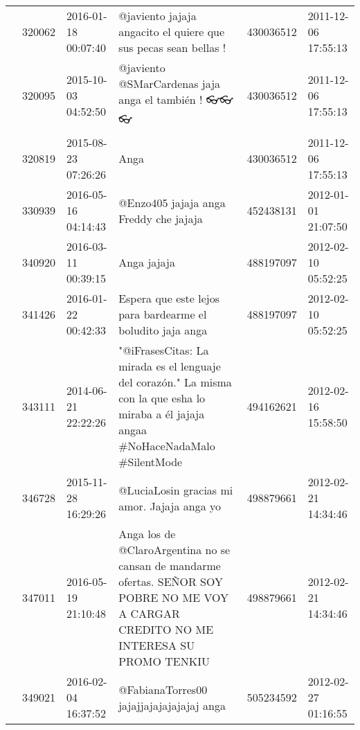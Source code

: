 \begin{tabular}{llllrl}
           & 320062  & 2016-01-18 00:07:40 &                                                                              @javiento jajaja angacito el quiere que sus pecas sean bellas ! &   430036512 & 2011-12-06 17:55:13 \\
           & 320095  & 2015-10-03 04:52:50 &                                                                                           @javiento @SMarCardenas jaja anga el también ! 👓👓👓 &   430036512 & 2011-12-06 17:55:13 \\
           & 320819  & 2015-08-23 07:26:26 &                                                                                                                                         Anga &   430036512 & 2011-12-06 17:55:13 \\
           & 330939  & 2016-05-16 04:14:43 &                                                                                                       @Enzo405 jajaja anga Freddy che jajaja &   452438131 & 2012-01-01 21:07:50 \\
           & 340920  & 2016-03-11 00:39:15 &                                                                                                                                  Anga jajaja &   488197097 & 2012-02-10 05:52:25 \\
           & 341426  & 2016-01-22 00:42:33 &                                                                                   Espera que este lejos para bardearme el boludito jaja anga &   488197097 & 2012-02-10 05:52:25 \\
           & 343111  & 2014-06-21 22:22:26 &      "@iFrasesCitas: La mirada es el lenguaje del corazón." La misma con la que esha lo miraba a él jajaja angaa \#NoHaceNadaMalo \#SilentMode &   494162621 & 2012-02-16 15:58:50 \\
           & 346728  & 2015-11-28 16:29:26 &                                                                                                  @LuciaLosin gracias mi amor. Jajaja anga yo &   498879661 & 2012-02-21 14:34:46 \\
           & 347011  & 2016-05-19 21:10:48 &      Anga los de @ClaroArgentina no se cansan de mandarme ofertas. SEÑOR SOY POBRE NO ME VOY A CARGAR CREDITO NO ME INTERESA SU PROMO TENKIU &   498879661 & 2012-02-21 14:34:46 \\
           & 349021  & 2016-02-04 16:37:52 &                                                                                                     @FabianaTorres00 jajajjajajajajajaj anga &   505234592 & 2012-02-27 01:16:55 \\

\end{tabular}
